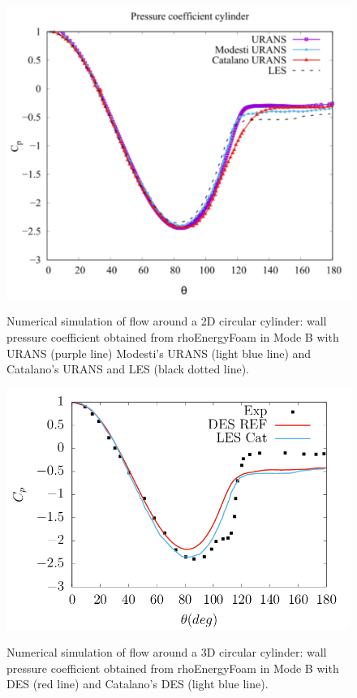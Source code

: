 \documentclass[a5paper]{sapthesis}
\begin{document}
	\begin{figure}
		\begin{center}
			\hspace{5mm}
			{\includegraphics[width=0.7\linewidth]{Figures/pressure_coeff_cylinder}}  
			\caption[Pressure coefficients for the URANS of the 2D cylinder]{Numerical simulation of ﬂow around a 2D circular cylinder: wall pressure coefficient obtained from rhoEnergyFoam in Mode B with URANS (purple line) Modesti's URANS (light blue line) and Catalano's URANS and LES (black dotted line).}
			\label{Cp_Cylinder_URANS}
		\end{center}
	\end{figure}
	
	\begin{figure}
		\begin{center}
			{\includegraphics[width=0.8\linewidth]{Figures/pressure_coefficient_DES}}  
			\caption[Pressure coefficients for the DES of the 3D cylinder]{Numerical simulation of ﬂow around a 3D circular cylinder: wall pressure coefficient obtained from rhoEnergyFoam in Mode B with DES (red line) and Catalano's DES (light blue line).}
			\label{Cp_Cylinder_DES}
		\end{center}
	\end{figure}
	
\end{document}

